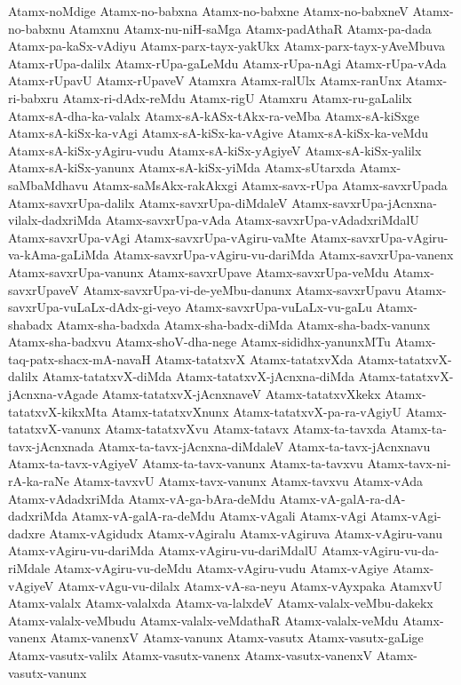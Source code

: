 {Atamx-noMdige
Atamx-no-babxna
Atamx-no-babxne
Atamx-no-babxneV
Atamx-no-babxnu
Atamxnu
Atamx-nu-niH-saMga
Atamx-padAthaR
Atamx-pa-dada
Atamx-pa-kaSx-vAdiyu
Atamx-parx-tayx-yakUkx
Atamx-parx-tayx-yAveMbuva
Atamx-rUpa-dalilx
Atamx-rUpa-gaLeMdu
Atamx-rUpa-nAgi
Atamx-rUpa-vAda
Atamx-rUpavU
Atamx-rUpaveV
Atamxra
Atamx-ralUlx
Atamx-ranUnx
Atamx-ri-babxru
Atamx-ri-dAdx-reMdu
Atamx-rigU
Atamxru
Atamx-ru-gaLalilx
Atamx-sA-dha-ka-valalx
Atamx-sA-kASx-tAkx-ra-veMba
Atamx-sA-kiSxge
Atamx-sA-kiSx-ka-vAgi
Atamx-sA-kiSx-ka-vAgive
Atamx-sA-kiSx-ka-veMdu
Atamx-sA-kiSx-yAgiru-vudu
Atamx-sA-kiSx-yAgiyeV
Atamx-sA-kiSx-yalilx
Atamx-sA-kiSx-yanunx
Atamx-sA-kiSx-yiMda
Atamx-sUtarxda
Atamx-saMbaMdhavu
Atamx-saMsAkx-rakAkxgi
Atamx-savx-rUpa
Atamx-savxrUpada
Atamx-savxrUpa-dalilx
Atamx-savxrUpa-diMdaleV
Atamx-savxrUpa-jAcnxna-vilalx-dadxriMda
Atamx-savxrUpa-vAda
Atamx-savxrUpa-vAdadxriMdalU
Atamx-savxrUpa-vAgi
Atamx-savxrUpa-vAgiru-vaMte
Atamx-savxrUpa-vAgiru-va-kAma-gaLiMda
Atamx-savxrUpa-vAgiru-vu-dariMda
Atamx-savxrUpa-vanenx
Atamx-savxrUpa-vanunx
Atamx-savxrUpave
Atamx-savxrUpa-veMdu
Atamx-savxrUpaveV
Atamx-savxrUpa-vi-de-yeMbu-danunx
Atamx-savxrUpavu
Atamx-savxrUpa-vuLaLx-dAdx-gi-veyo
Atamx-savxrUpa-vuLaLx-vu-gaLu
Atamx-shabadx
Atamx-sha-badxda
Atamx-sha-badx-diMda
Atamx-sha-badx-vanunx
Atamx-sha-badxvu
Atamx-shoV-dha-nege
Atamx-sididhx-yanunxMTu
Atamx-taq-patx-shacx-mA-navaH
Atamx-tatatxvX
Atamx-tatatxvXda
Atamx-tatatxvX-dalilx
Atamx-tatatxvX-diMda
Atamx-tatatxvX-jAcnxna-diMda
Atamx-tatatxvX-jAcnxna-vAgade
Atamx-tatatxvX-jAcnxnaveV
Atamx-tatatxvXkekx
Atamx-tatatxvX-kikxMta
Atamx-tatatxvXnunx
Atamx-tatatxvX-pa-ra-vAgiyU
Atamx-tatatxvX-vanunx
Atamx-tatatxvXvu
Atamx-tatavx
Atamx-ta-tavxda
Atamx-ta-tavx-jAcnxnada
Atamx-ta-tavx-jAcnxna-diMdaleV
Atamx-ta-tavx-jAcnxnavu
Atamx-ta-tavx-vAgiyeV
Atamx-ta-tavx-vanunx
Atamx-ta-tavxvu
Atamx-tavx-ni-rA-ka-raNe
Atamx-tavxvU
Atamx-tavx-vanunx
Atamx-tavxvu
Atamx-vAda
Atamx-vAdadxriMda
Atamx-vA-ga-bAra-deMdu
Atamx-vA-galA-ra-dA-dadxriMda
Atamx-vA-galA-ra-deMdu
Atamx-vAgali
Atamx-vAgi
Atamx-vAgi-dadxre
Atamx-vAgidudx
Atamx-vAgiralu
Atamx-vAgiruva
Atamx-vAgiru-vanu
Atamx-vAgiru-vu-dariMda
Atamx-vAgiru-vu-dariMdalU
Atamx-vAgiru-vu-da-riMdale
Atamx-vAgiru-vu-deMdu
Atamx-vAgiru-vudu
Atamx-vAgiye
Atamx-vAgiyeV
Atamx-vAgu-vu-dilalx
Atamx-vA-sa-neyu
Atamx-vAyxpaka
AtamxvU
Atamx-valalx
Atamx-valalxda
Atamx-va-lalxdeV
Atamx-valalx-veMbu-dakekx
Atamx-valalx-veMbudu
Atamx-valalx-veMdathaR
Atamx-valalx-veMdu
Atamx-vanenx
Atamx-vanenxV
Atamx-vanunx
Atamx-vasutx
Atamx-vasutx-gaLige
Atamx-vasutx-valilx
Atamx-vasutx-vanenx
Atamx-vasutx-vanenxV
Atamx-vasutx-vanunx
}

